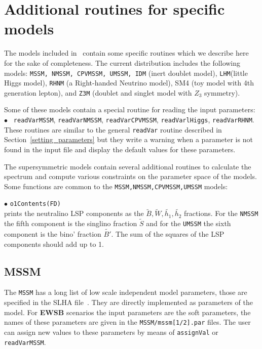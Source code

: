 \documentclass[12pt,a4paper]{article}
\begin{document}
{\section{Additional routines for specific models}
The models included in \micro\ contain some specific routines
which we describe here for the sake of completeness. The current 
distribution includes the following models: {\tt MSSM, NMSSM, CPVMSSM, UMSSM, IDM}  (inert doublet model), {\tt LHM}(little Higgs model),
{\tt RHNM} (a Right-handed Neutrino model), SM4 (toy model with 4th generation lepton), and {\tt Z3M} (doublet and singlet model with $Z_3$ symmetry). 

Some of these models contain a special routine for reading the input parameters:\\
$\bullet$ \verb| readVarMSSM|, \verb|readVarNMSSM|,  \verb|readVarCPVMSSM|,
\verb|readVarlHiggs|, \verb|readVarRHNM|.\\
 These routines  are similar to the general 
\verb|readVar| routine described  in Section~\ref{setting_parameters}
but  they write a warning when a parameter is not found in the 
input file and display the default values for these parameters.

The supersymmetric models contain several additional routines to calculate the spectrum
and compute various constraints on the parameter space of the models. Some functions are
common to the \verb|MSSM,NMSSM,CPVMSSM,UMSSM| models: 


\noindent
$\bullet$  \verb|o1Contents(FD)|\\
prints  the neutralino LSP components as the  $\tilde{B},\tilde{W},
\tilde{h_1},\tilde{h_2}$ fractions. For the {\tt NMSSM} the fifth component is
the singlino fraction  $\tilde{S}$ and for the {\tt UMSSM} the sixth component is
the bino' fraction  $\tilde{B'}$. The sum of the squares of the LSP components
should add up to 1. 



\subsection{MSSM}
The {\tt MSSM} has a long list of low scale  independent model 
parameters, those are specified in the SLHA file~\cite{Skands:2003cj,Allanach:2008qq}.
They are directly implemented as parameters of the model.
For {\bf EWSB} scenarios the input parameters are  the soft parameters, the names 
of these parameters are given in the {\tt MSSM/mssm[1/2].par} files.
The user  can assign new values to these parameters by means of {\tt assignVal}
or {\tt readVarMSSM}.

}
\end{document}
